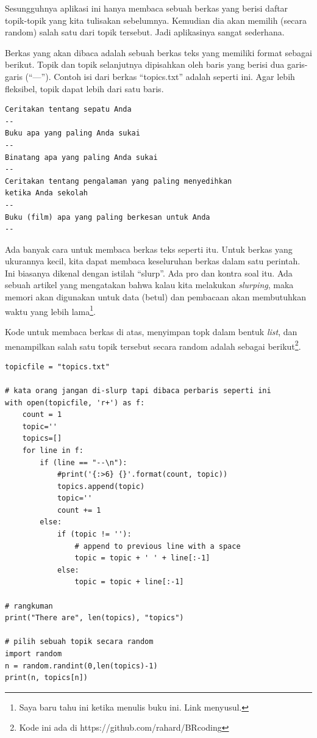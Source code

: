 Sesungguhnya aplikasi ini hanya membaca sebuah berkas yang berisi 
daftar topik-topik yang kita tulisakan sebelumnya. Kemudian dia 
akan memilih (secara random) salah satu dari topik tersebut.
Jadi aplikasinya sangat sederhana. 

Berkas yang akan dibaca adalah sebuah berkas teks yang memiliki
format sebagai berikut. Topik dan topik selanjutnya dipisahkan oleh
baris yang berisi dua garis-garis (``---''). Contoh isi dari
berkas ``topics.txt'' adalah seperti ini.
Agar lebih fleksibel, topik dapat lebih dari satu baris.

\begin{verbatim}
Ceritakan tentang sepatu Anda
--
Buku apa yang paling Anda sukai
--
Binatang apa yang paling Anda sukai
--
Ceritakan tentang pengalaman yang paling menyedihkan
ketika Anda sekolah
--
Buku (film) apa yang paling berkesan untuk Anda
--
\end{verbatim}


Ada banyak cara untuk membaca berkas teks seperti itu.
Untuk berkas yang ukurannya kecil, kita dapat membaca keseluruhan
berkas dalam satu perintah. Ini biasanya dikenal dengan istilah ``slurp''.
Ada pro dan kontra soal itu.
Ada sebuah artikel yang mengatakan bahwa kalau kita melakukan {\em slurping},
maka memori akan digunakan untuk data (betul) dan pembacaan
akan membutuhkan waktu yang lebih lama\footnote{Saya baru tahu ini ketika
menulis buku ini. Link menyusul.}.

Kode untuk membaca berkas di atas, menyimpan topk dalam
bentuk {\em list}, dan menampilkan salah satu topik tersebut
secara random adalah sebagai berikut\footnote{Kode ini ada di 
https://github.com/rahard/BRcoding}.

\begin{verbatim}
topicfile = "topics.txt"

# kata orang jangan di-slurp tapi dibaca perbaris seperti ini
with open(topicfile, 'r+') as f:
    count = 1 
    topic=''
    topics=[]
    for line in f:
        if (line == "--\n"):
            #print('{:>6} {}'.format(count, topic))
            topics.append(topic)
            topic=''
            count += 1
        else:
            if (topic != ''):
                # append to previous line with a space
                topic = topic + ' ' + line[:-1]
            else:
                topic = topic + line[:-1] 

# rangkuman
print("There are", len(topics), "topics")

# pilih sebuah topik secara random
import random
n = random.randint(0,len(topics)-1)
print(n, topics[n])
\end{verbatim}

